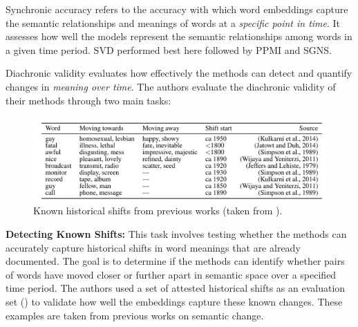 
Synchronic accuracy refers to the accuracy with which word embeddings capture the semantic relationships and meanings of words at a \emph{specific point in time}.
It assesses how well the models represent the semantic relationships among words in a given time period.
SVD performed best here followed by PPMI and SGNS\@.

Diachronic validity evaluates how effectively the methods can detect and quantify changes in \emph{meaning over time}.
The authors evaluate the diachronic validity of their methods through two main tasks:

\begin{figure}[tbh]
    \centering
    \vspace{-1em}
    \includegraphics[scale=0.27]{figures/hamilton_known_shifts}
    \vspace*{-0.5cm}
    \caption{Known historical shifts from previous works (taken from \cite{hamilton-etal-2016-diachronic}).}
    \label{fig:hamilton-known-shifts}
\end{figure}

\textbf{Detecting Known Shifts:}
This task involves testing whether the methods can accurately capture historical shifts in word meanings that are already documented.
The goal is to determine if the methods can identify whether pairs of words have moved closer or further apart in semantic space over a specified time period.
The authors used a set of attested historical shifts as an evaluation set () to validate how well the embeddings capture these known changes.
These examples are taken from previous works on semantic change.

